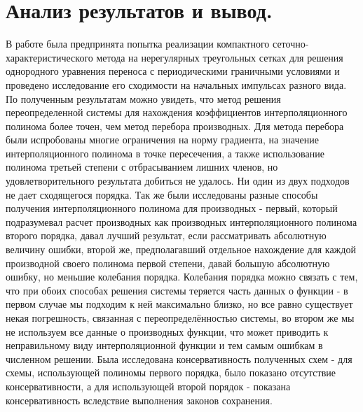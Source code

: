 \documentclass[14pt]{article}
\begin{document}
\section{Анализ результатов и вывод.}
В работе была предпринята попытка реализации компактного сеточно-характеристического метода на нерегулярных треугольных сетках для решения однородного уравнения переноса с периодическими граничными условиями и проведено исследование его сходимости на начальных импульсах разного вида. По полученным результатам можно увидеть, что метод решения переопределенной системы для нахождения коэффициентов интерполяционного полинома более точен, чем метод перебора производных. Для метода перебора были испробованы многие ограничения на норму градиента, на значение интерполяционного полинома в точке пересечения, а также использование полинома третьей степени с отбрасыванием лишних членов, но удовлетворительного результата добиться не удалось. Ни один из двух подходов не дает сходящегося порядка. Так же были исследованы разные способы получения интерполяционного полинома для производных - первый, который подразумевал расчет производных как производных интерполяционного полинома второго порядка, давал лучший результат, если рассматривать абсолютную величину ошибки, второй же, предполагавший отдельное нахождение для каждой производной своего полинома первой степени, давай большую абсолютную ошибку, но меньшие колебания порядка. Колебания порядка можно связать с тем, что при обоих способах решения системы теряется часть данных о функции - в первом случае мы подходим к ней максимально близко, но все равно существует некая погрешность, связанная с переопределённостью системы, во втором же мы не используем все данные о производных функции, что может приводить к неправильному виду интерполяционной функции и тем самым ошибкам в численном решении. Была исследована консервативность полученных схем - для схемы, использующей полиномы первого порядка, было показано отсутствие консервативности, а для использующей второй порядок - показана консервативность вследствие выполнения законов сохранения.
\end{document}
